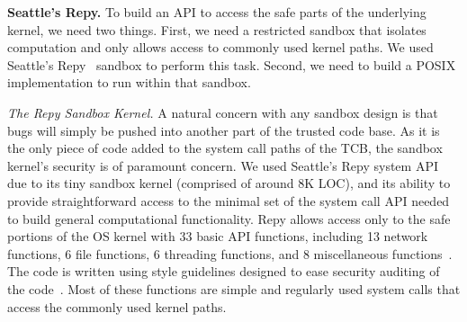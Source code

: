 %

\textbf{Seattle's Repy.}
To build an API to access the safe parts of the underlying kernel, we need
two things.  First, we need a restricted sandbox that isolates computation
and only allows access to commonly used kernel paths.  We used
Seattle's Repy~\cite{Repy-10} sandbox to perform this task.
Second, we need to build a POSIX implementation to run within that sandbox.


\textit{The Repy Sandbox Kernel.}
A natural concern with any sandbox design is that bugs will simply be pushed into
another part of the trusted code base.  As it is the only piece of code added
to the system call paths of the TCB, the sandbox kernel's security is of
paramount concern. 
We used Seattle's Repy system API due to its tiny sandbox kernel
(comprised of around 8K LOC), and its ability to provide straightforward 
access to the minimal set of the system call API needed to build general 
computational functionality. Repy allows
access only to the safe portions of the OS kernel with 33 basic API 
functions, including 13 network functions, 6 file functions, 6 threading functions,
and 8 miscellaneous functions~\cite{Repy-10, RepyKernel}. The code is 
written using style guidelines designed to ease security auditing
 of the code~\cite{style}. Most of these functions are simple and
regularly used system calls that access the commonly used kernel paths.

